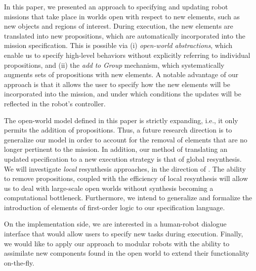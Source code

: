 In this paper, we presented an approach to specifying and updating robot missions that take place in worlds open with respect to new elements, such as new objects and regions of interest. During execution, the new elements are translated into new propositions, which are automatically incorporated into the mission specification. This is possible via (i) \emph{open-world abstractions}, which enable us to specify high-level behaviors without explicitly referring to individual propositions, and (ii) the \emph{add to Group} mechanism, which systematically augments sets of propositions with new elements. A notable advantage of our approach is that it allows the user to specify how the new elements will be incorporated into the mission, and under which conditions the updates will be reflected in the robot's controller.

The open-world model defined in this paper is strictly expanding, i.e., it only permits the addition of propositions. Thus, a future research direction is to generalize our model in order to account for the removal of elements that are no longer pertinent to the mission. 
In addition, our method of translating an updated specification to a new execution strategy is that of global resynthesis. We will investigate \emph{local} resynthesis approaches, in the direction of \cite{MurrayICRA2012, MurrayICRA2013a}.
The ability to remove propositions, coupled with the efficiency of local resynthesis will allow us to deal with large-scale open worlds without synthesis becoming a computational bottleneck.
Furthermore, we intend to generalize and formalize the introduction of elements of first-order logic to our specification language.

On the implementation side, we are interested in a human-robot dialogue interface that would allow users to specify new tasks during execution.
Finally, we would like to apply our approach to modular robots \cite{ModularIROS2011} with the ability to assimilate new components found in the open world to extend their functionality on-the-fly.
